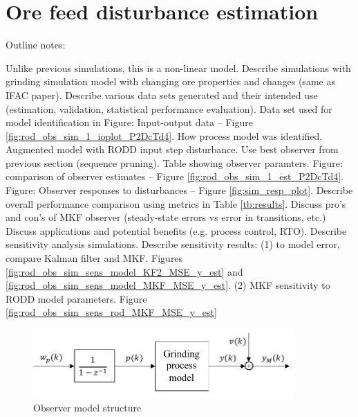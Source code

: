 \section{Ore feed disturbance estimation} \label{section:sim-ore-SISO}

Outline notes:
\begin{outline}
	\1 Unlike previous simulations, this is a non-linear model.
	\1 Describe simulations with grinding simulation model with changing ore properties and changes (same as IFAC paper).
	\1 Describe various data sets generated and their intended use (estimation, validation, statistical performance evaluation).
	\1 Data set used for model identification in Figure: Input-output data – Figure \ref{fig:rod_obs_sim_1_ioplot_P2DcTd4}.
	\1 How process model was identified.
	\1 Augmented model with RODD input step disturbance.
	\1 Use best observer from previous section (sequence pruning).
	\1 Table showing observer paramters.
	\1 Figure: comparison of observer estimates – Figure \ref{fig:rod_obs_sim_1_est_P2DcTd4}.
	\1 Figure: Observer responses to disturbances – Figure \ref{fig:sim_resp_plot}.
	\1 Describe overall performance comparison using metrics in Table \ref{tb:results}.
	\1 Discuss pro's and con's of MKF observer (steady-state errors vs error in transitions, etc.)
	\1 Discuss applications and potential benefits (e.g. process control, RTO).
	\1 Describe sensitivity analysis simulations.
	\1 Describe sensitivity results:
	\2 (1) to model error, compare Kalman filter and MKF. Figures \ref{fig:rod_obs_sim_sens_model_KF2_MSE_y_est} and \ref{fig:rod_obs_sim_sens_model_MKF_MSE_y_est}.
	\2 (2) MKF sensitivity to RODD model parameters. Figure  \ref{fig:rod_obs_sim_sens_rod_MKF_MSE_y_est}
\end{outline}

\begin{figure}[htp]
	\centering
	\includegraphics[width=10cm]{images/obs-model-diag.pdf}
	\caption{Observer model structure}
	\label{fig:obs_model}
\end{figure}

